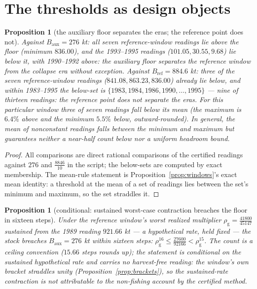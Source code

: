 \documentclass[10pt,twocolumn]{article}
\theoremstyle{plain}
\newtheorem{proposition}[theorem]{Proposition}
\theoremstyle{remark}
\begin{document}
\section{The thresholds as design objects}\label{design}

\begin{proposition}[the auxiliary floor separates the eras; the
reference point does not]\label{prop:discrimination}
Against \(B_{\mathrm{aux}} = 276\) kt: all seven reference-window
readings lie above the floor (minimum \(836.00\)), and the 1993--1995
readings (\(101.05, 30.55, 9.68\)) lie below it, with 1990--1992
above: the auxiliary floor separates the reference window from the
collapse era without exception. Against
\(B_{\mathrm{ref}} = 884.6\) kt: three of the seven reference-window
readings (\(841.08, 863.23, 836.00\)) already lie below, and within
1983--1995 the below-set is \(\{1983, 1984, 1986, 1990, \dots, 1995\}\)
--- nine of thirteen readings: the reference point does not separate
the eras. For this particular window three of seven readings fall below its
mean (the maximum is \(6.4\%\) above and the minimum \(5.5\%\)
below, outward-rounded). In general, the mean of nonconstant readings
falls between the minimum and maximum but guarantees neither a near-half
count below nor a uniform headroom bound.
\end{proposition}

\begin{proof}
All comparisons are direct rational comparisons of the certified
readings against \(276\) and \(\tfrac{8846}{10}\) in the script; the
below-sets are computed by exact membership. The mean-rule statement
is Proposition~\ref{prop:windows}'s exact mean identity: a threshold
at the mean of a set of readings lies between the set's minimum and
maximum, so the set straddles it.
\end{proof}

\begin{proposition}[conditional: sustained worst-case contraction
breaches the floor in sixteen steps]\label{prop:sustained}
Under the reference window's worst realized multiplier
\(\rho_{\mathrm{g}} = \tfrac{41800}{45147}\) sustained from the 1989
reading \(921.66\) kt --- a hypothetical rate, held fixed ---
the stock breaches \(B_{\mathrm{aux}} = 276\) kt within sixteen steps:
\(\rho_{\mathrm{g}}^{16} \le \tfrac{27600}{92166} < \rho_{\mathrm{g}}^{15}\).
The count is a ceiling convention (\(15.66\) steps rounds up); the
statement is conditional on the sustained hypothetical rate and
carries no harvest-free reading: the window's own bracket straddles
unity (Proposition~\ref{prop:brackets}), so the sustained-rate
contraction is not attributable to the non-fishing account by the
certified method.
\end{proposition}
\end{document}
